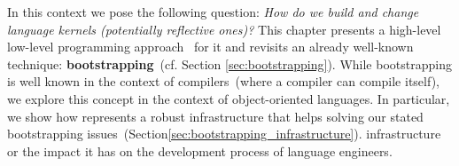 


In this context we pose the following question: \emph{How do we build and change language kernels (potentially reflective ones)?} This chapter presents a high-level low-level programming approach~\cite{Fram09a} for it and revisits an already well-known technique: \textbf{bootstrapping}~(cf. Section \ref{sec:bootstrapping}). While bootstrapping is well known in the context of compilers~(where a compiler can compile itself), we explore this concept in the context of object-oriented languages. In particular, we show how \Vtt represents a robust infrastructure that helps solving our stated bootstrapping issues~(Section\ref{sec:bootstrapping_infrastructure}). infrastructure or the impact it has on the development process of language engineers. 


